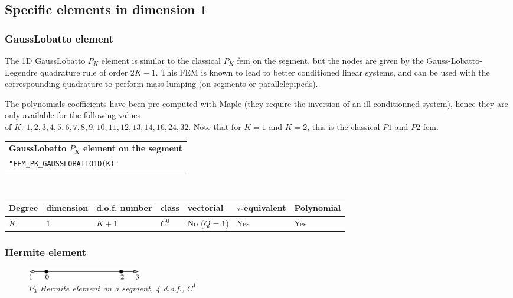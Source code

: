 \documentclass[10pt,a4paper]{article}
\begin{document}
\subsection{Specific elements in dimension 1}

\subsubsection{GaussLobatto element}

The 1D GaussLobatto $P_K$ element is similar to the classical $P_K$ fem on the segment, but
the nodes are given by the Gauss-Lobatto-Legendre quadrature rule of
order $2K-1$. This FEM is known to lead to better conditioned linear
systems, and can be used with the correspounding quadrature to perform
mass-lumping (on segments or parallelepipeds).

The polynomials coefficients have been pre-computed with Maple (they require the inversion of an ill-conditionned system), hence they are only available for the following values \\ of $K$: $1, 2, 3, 4, 5, 6, 7, 8, 9, 10, 11, 12, 13, 14, 16, 24, 32$. Note that for $K=1$ and $K=2$, this is the classical $P1$ and $P2$ fem.

\begin{center}
\begin{tabular}{|m{16.11cm}|} \hline 
{\bf GaussLobatto $P_K$ element on the segment}\\
{\tt "FEM\_PK\_GAUSSLOBATTO1D(K)"}
\end{tabular} \\ \vspace{-1pt} 
\begin{tabular}{|m{2cm}|m{2cm}|m{2.5cm}|m{1.2cm}|m{2cm}|m{2cm}|m{1.8cm}|} \hline 
Degree & dimension & d.o.f. number & class & vectorial & \mbox{$\tau$-equivalent} & Polynomial\\ \hline
$K$ & $1$ & $K+1$ & $C^0$ & No \mbox{($Q = 1$)} & Yes & Yes\\ \hline
\end{tabular}
\end{center}

\subsubsection{Hermite element}

\begin{figure}[H]
  \begin{center}
    \includegraphics[width=5cm,angle=0]{getfemlist_segment_hermite.eps}
  \end{center}
  \caption{ \it $P_3$ Hermite element on a segment, 4 d.o.f., $C^1$} 
  \label{fig:segment_hermite}
\end{figure}
\end{document}
